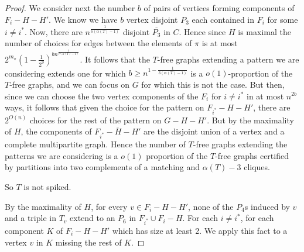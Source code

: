 \documentclass[10pt,a4paper]{amsart}
\begin{document}
\begin{proof}
We consider next the  number $b$  of pairs of vertices forming  components of $F_i-H-H'$. We know  we have $b$ vertex disjoint $P_3$ each contained in $F_i$ for some $i \neq i^*$. Now, there are $n^{\frac{1}{6(\alpha(T)-1)}}$
disjoint $\overline {P_3}$ in $C$. Hence since $H$ is maximal the number of choices for edges between the elements of  $\pi$ 
is at most $ 2^{m_\pi}(1-\frac{1}{2^9})^{bn^{\frac{1}{7(\alpha(T)-1)}}}$.
It follows that the $T$-free graphs  extending a pattern we are considering extends one for which $b \ge n^{1-\frac{1}{3(\alpha(T)-1)}}$ 
is a $o(1)$-proportion of the $T$-free graphs, 
and we can focus on $G$ for which this is not  the case.
But then, since we can choose the two vertex components of the $F_i$ for $i \neq i^*$  in at most $n^{2b}$ ways, it follows that given  the choice for the pattern 
on $F_{i^*}-H-H'$, there are $2^{O(n)}$ choices for the rest of the pattern on $G-H-H'$. But by the maximality of $H$,  the components  of $\overline{F_{i^*}-H-H'}$
are the disjoint union of a vertex and a complete multipartite graph. Hence the number of $T$-free graphs extending the patterns we are considering 
is a $o(1)$ proportion of the $T$-free graphs certified by partitions into two complements of a matching and $\alpha(T)-3$ cliques.

So $T$ is not spiked. 

By the maximality of $H$,  for every $v \in F_i-H-H'$, none of the $P_4$s  induced by $v$ and a triple in $T_v$ extend to an  $P_6$ in $F_{i^*} \cup F_i-H$.
For each $i \neq i^*$,  for each component $K$ of $F_i-H-H'$ which has size at least 2. 
We apply  this fact to a vertex  $v$ in $K$ missing the rest of $K$. 



\end{proof}
\end{document}
